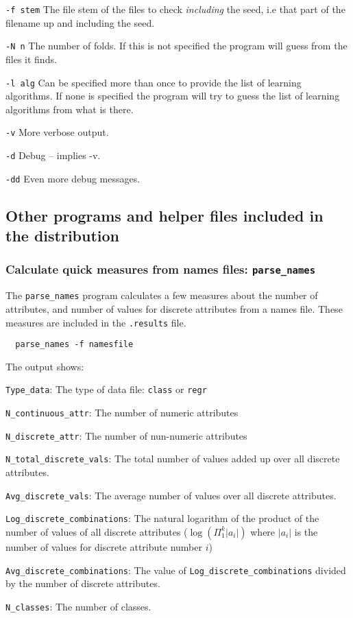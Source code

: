 \documentclass[a4paper,10pt,twoside]{article}
\newenvironment{optionlist}
{\begin{list}{}
    {\setlength{\itemsep}{0em plus0em minus0ex}
      \setlength{\parsep}{0ex}
      \setlength{\topsep}{0em}
      \setlength{\leftmargin}{2em}
      \setlength{\listparindent}{0em}
      \setlength{\itemindent}{-2em}
      \setlength{\partopsep}{0ex}
    }}
  {\end{list}}
\begin{document}
\begin{optionlist}
\item \verb=-f stem= The file stem of the files to check \emph{including} the seed, i.e that part of the filename up and including the seed.
\item \verb=-N n= The number of folds. If this is not specified the
program will guess from the files it finds.
\item \verb=-l alg= Can be specified more than once to provide the 
list of learning algorithms. If none is specified the program will 
try to guess the list of learning algorithms from what is there.
\item \verb=-v= More verbose output.
\item \verb=-d= Debug -- implies -v.
\item \verb=-dd= Even more debug messages.
\end{optionlist}           



\subsection{Other programs and helper files included in the distribution}

\subsubsection{Calculate quick measures from names files: \texttt{parse\_names}}
\label{parsenames}
The \verb=parse_names= program calculates a few measures about the
number of attributes, and number of values for discrete attributes
from a
names file. These measures are included in the \texttt{.results}
file. 
 
\begin{verbatim}
  parse_names -f namesfile 
\end{verbatim}

The output shows:
\begin{optionlist}
\item \verb=Type_data=: The type of data file: \verb=class= or \verb=regr=
\item \verb=N_continuous_attr=: The number of numeric attributes
\item \verb=N_discrete_attr=: The number of nun-numeric attributes
\item \verb=N_total_discrete_vals=: The total number of values added 
  up over all discrete attributes.
\item \verb=Avg_discrete_vals=: The average number of values over
  all discrete attributes.
\item \verb=Log_discrete_combinations=: The natural logarithm of
  the product of the number of values of all discrete attributes
  ($\log(\Pi_1^k |a_i|)$ where $|a_i|$ is the number of values for 
  discrete attribute number $i$)
\item \verb=Avg_discrete_combinations=: The value of \verb=Log_discrete_combinations= divided by the number of discrete attributes.
\item \verb=N_classes=: The number of classes.
\end{optionlist}
\end{document}

